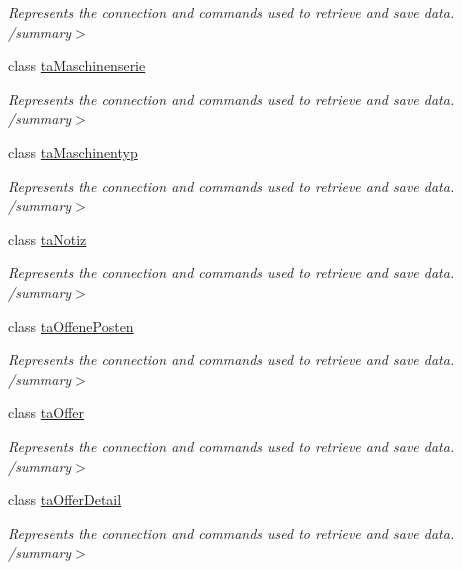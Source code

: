 \begin{DoxyCompactItemize}
\begin{DoxyCompactList}\small\item\em Represents the connection and commands used to retrieve and save data. /summary$>$ \end{DoxyCompactList}\item 
class \hyperlink{class_products_1_1_data_1_1ds_sage_table_adapters_1_1ta_maschinenserie}{ta\+Maschinenserie}
\begin{DoxyCompactList}\small\item\em Represents the connection and commands used to retrieve and save data. /summary$>$ \end{DoxyCompactList}\item 
class \hyperlink{class_products_1_1_data_1_1ds_sage_table_adapters_1_1ta_maschinentyp}{ta\+Maschinentyp}
\begin{DoxyCompactList}\small\item\em Represents the connection and commands used to retrieve and save data. /summary$>$ \end{DoxyCompactList}\item 
class \hyperlink{class_products_1_1_data_1_1ds_sage_table_adapters_1_1ta_notiz}{ta\+Notiz}
\begin{DoxyCompactList}\small\item\em Represents the connection and commands used to retrieve and save data. /summary$>$ \end{DoxyCompactList}\item 
class \hyperlink{class_products_1_1_data_1_1ds_sage_table_adapters_1_1ta_offene_posten}{ta\+Offene\+Posten}
\begin{DoxyCompactList}\small\item\em Represents the connection and commands used to retrieve and save data. /summary$>$ \end{DoxyCompactList}\item 
class \hyperlink{class_products_1_1_data_1_1ds_sage_table_adapters_1_1ta_offer}{ta\+Offer}
\begin{DoxyCompactList}\small\item\em Represents the connection and commands used to retrieve and save data. /summary$>$ \end{DoxyCompactList}\item 
class \hyperlink{class_products_1_1_data_1_1ds_sage_table_adapters_1_1ta_offer_detail}{ta\+Offer\+Detail}
\begin{DoxyCompactList}\small\item\em Represents the connection and commands used to retrieve and save data. /summary$>$ \end{DoxyCompactList}\item 

\end{DoxyCompactItemize}
